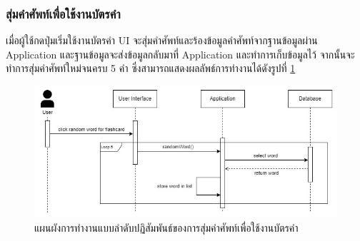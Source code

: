 \documentclass[12pt,oneside,openright,a4paper]{cpe-thai-project}
\begin{document}

\pagebreak
\subsubsection{สุ่มคำศัพท์เพื่อใช้งานบัตรคำ}
\hspace{1cm}
เมื่อผู้ใช้กดปุ่มเริ่มใช้งานบัตรคำ UI จะสุ่มคำศัพท์และร้องข้อมูลคำศัพท์จากฐานข้อมูลผ่าน Application
และฐานข้อมูลจะส่งข้อมูลกลับมาที่ Application และทำการเก็บข้อมูลไว้ จากนั้นจะทำการสุ่มคำศัพท์ใหม่จนครบ 5 คำ
ซึ่งสามารถแสดงผลลัพธ์การทำงานได้ดังรูปที่ \ref{fig:S_RandomFlashcard}
\begin{figure}[!h]\centering
	\includegraphics[width=\textwidth, keepaspectratio=true]{image/chap3/sequence/Flash-Random.jpg}
	\caption{แผนผังการทำงานแบบลำดับปฏิสัมพันธ์ของการสุ่มคำศัพท์เพื่อใช้งานบัตรคำ}\label{fig:S_RandomFlashcard}
\end{figure}

\pagebreak
\end{document}
